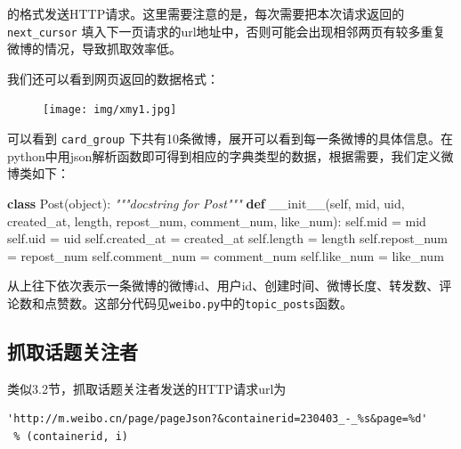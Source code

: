 \documentclass[a4paper,UTF8]{ctexart}
\newenvironment{Shaded}{}{}
\newcommand{\KeywordTok}[1]{\textcolor[rgb]{0.00,0.44,0.13}{\textbf{{#1}}}}
\newcommand{\CommentTok}[1]{\textcolor[rgb]{0.38,0.63,0.69}{\textit{{#1}}}}
\newcommand{\FunctionTok}[1]{\textcolor[rgb]{0.02,0.16,0.49}{{#1}}}
\newcommand{\VariableTok}[1]{\textcolor[rgb]{0.10,0.09,0.49}{{#1}}}
\newcommand{\OperatorTok}[1]{\textcolor[rgb]{0.40,0.40,0.40}{{#1}}}
\newcommand{\BuiltInTok}[1]{{#1}}
\newcommand{\NormalTok}[1]{{#1}}
\begin{document}
的格式发送HTTP请求。这里需要注意的是，每次需要把本次请求返回的
\texttt{next\_cursor}
填入下一页请求的url地址中，否则可能会出现相邻两页有较多重复微博的情况，导致抓取效率低。

我们还可以看到网页返回的数据格式：

\begin{figure}[htbp]
\centering
\texttt{[image: img/xmy1.jpg]}
\caption{}
\end{figure}

可以看到 \texttt{card\_group}
下共有10条微博，展开可以看到每一条微博的具体信息。在python中用json解析函数即可得到相应的字典类型的数据，根据需要，我们定义微博类如下：

\begin{Shaded}
\begin{Highlighting}[]
\KeywordTok{class} \NormalTok{Post(}\BuiltInTok{object}\NormalTok{):}
    \CommentTok{"""docstring for Post"""}
    \KeywordTok{def} \FunctionTok{__init__}\NormalTok{(}\VariableTok{self}\NormalTok{, mid, uid, created_at, length, repost_num,}
                 \NormalTok{comment_num, like_num):}
        \VariableTok{self}\NormalTok{.mid }\OperatorTok{=} \NormalTok{mid}
        \VariableTok{self}\NormalTok{.uid }\OperatorTok{=} \NormalTok{uid}
        \VariableTok{self}\NormalTok{.created_at }\OperatorTok{=} \NormalTok{created_at}
        \VariableTok{self}\NormalTok{.length }\OperatorTok{=} \NormalTok{length}
        \VariableTok{self}\NormalTok{.repost_num }\OperatorTok{=} \NormalTok{repost_num}
        \VariableTok{self}\NormalTok{.comment_num }\OperatorTok{=} \NormalTok{comment_num}
        \VariableTok{self}\NormalTok{.like_num }\OperatorTok{=} \NormalTok{like_num}
\end{Highlighting}
\end{Shaded}

从上往下依次表示一条微博的微博id、用户id、创建时间、微博长度、转发数、评论数和点赞数。这部分代码见\texttt{weibo.py}中的\texttt{topic\_posts}函数。

\subsection{抓取话题关注者}\label{ux6293ux53d6ux8bddux9898ux5173ux6ce8ux8005}

类似3.2节，抓取话题关注者发送的HTTP请求url为

\begin{verbatim}
'http://m.weibo.cn/page/pageJson?&containerid=230403_-_%s&page=%d'
 % (containerid, i)
\end{verbatim}
\end{document}
